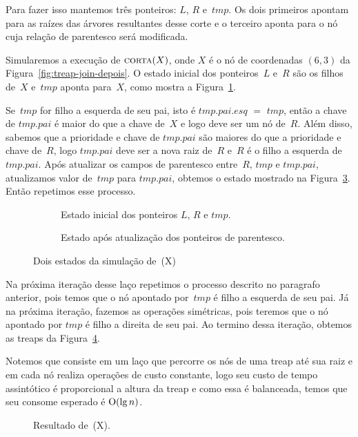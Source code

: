 Para fazer isso mantemos três ponteiros: $L$, $R$ e~$tmp$. 
Os dois primeiros apontam para as raízes das árvores resultantes desse corte e o terceiro aponta para o nó cuja relação de parentesco será modificada.

Simularemos a execução de $\text{\scshape corta}(X)$, onde $X$ é o nó de coordenadas $(6,3)$ da Figura~\ref{fig:treap-join-depois}.
O estado inicial dos ponteiros~$L$ e~$R$ são os filhos de~$X$ e~$tmp$ aponta para~$X$, como mostra a Figura~\ref{fig:treap-split-1}.

Se~$tmp$ for filho a esquerda de seu pai, isto é $tmp$.$pai$.$esq$ $=$ $tmp$, então a chave de $tmp$.$pai$ é maior do que a chave de~$X$ e logo deve ser um nó de~$R$.
Além disso, sabemos que a prioridade e chave de $tmp$.$pai$ são maiores do que a prioridade e chave de~$R$, logo $tmp$.$pai$ deve ser a nova raiz de~$R$ e~$R$ é o filho a esquerda de~$tmp$.$pai$.
Após atualizar os campos de parentesco entre~$R$, $tmp$ e $tmp$.$pai$, atualizamos valor de~$tmp$ para $tmp$.$pai$, obtemos o estado mostrado na Figura~\ref{fig:treap-split-2}.
Então repetimos esse processo. 


\begin{figure}[htb]
\begin{subfigure}{0.3\textwidth}

\caption{Estado inicial dos ponteiros $L$, $R$ e $tmp$.}
\label{fig:treap-split-1}
\end{subfigure}
\hspace{1cm}
\begin{subfigure}{0.3\textwidth}

\caption{Estado após atualização dos ponteiros de parentesco.}
\label{fig:treap-split-2}
\end{subfigure}
\caption{Dois estados da simulação de~\treapSplit(X)}
\end{figure}

Na próxima iteração desse laço repetimos o processo descrito no paragrafo anterior, pois temos que o nó apontado por~$tmp$ é filho a esquerda de seu pai.
Já na próxima iteração, fazemos as operações simétricas, pois teremos que o nó apontado por $tmp$ é filho a direita de seu pai.
Ao termino dessa iteração, obtemos as treaps da Figura~\ref{fig:treap-split-final}.


Notemos que \treapSplit{} consiste em um laço que percorre os nós de uma treap até sua raiz e em cada nó realiza operações de custo constante, logo seu custo de tempo assintótico é proporcional a altura da treap e como essa é balanceada, temos que seu consome esperado é $\mathrm{O}(\lg n)$.




\begin{figure}[htb]
\centering

\caption{Resultado de~\treapSplit(X).}
\label{fig:treap-split-final}
\end{figure}
